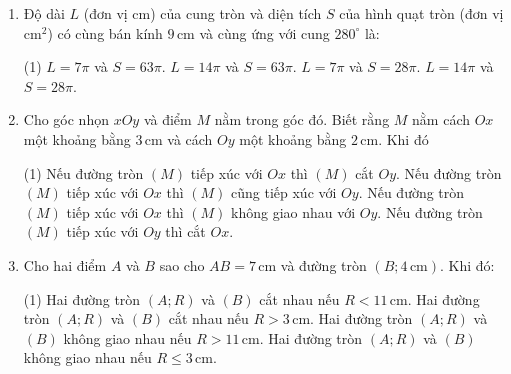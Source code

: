 \begin{practice}
\begin{enumerate}
        \begin{tasks}(1)
            \task[(A)] Điểm đối xứng với $A$ qua $CG$ là $B$.
            \task[(B)] Điểm đối xứng với $A$ qua $CG$ là $D$.
            \task[(C)] Điểm đối xứng với $A$ qua $CG$ là $E$.
            \task[(D)] Điểm đối xứng với $A$ qua $CG$ là $G$.
        \end{tasks}
        \par\noindent\answerbox\par

        \item Độ dài $L$ (đơn vị cm) của cung tròn và diện tích $S$ của hình quạt tròn (đơn vị $\mathrm{cm}^2$) có cùng bán kính $9\,\mathrm{cm}$ và cùng ứng với cung $280^\circ$ là:
        \begin{tasks}(1)
            \task[(A)] $L=7\pi$ và $S=63\pi$.
            \task[(B)] $L=14\pi$ và $S=63\pi$.
            \task[(C)] $L=7\pi$ và $S=28\pi$.
            \task[(D)] $L=14\pi$ và $S=28\pi$.
        \end{tasks}
        \par\noindent\answerbox\par

        \item Cho góc nhọn $xOy$ và điểm $M$ nằm trong góc đó. Biết rằng $M$ nằm cách $Ox$ một khoảng bằng $3\,\mathrm{cm}$ và cách $Oy$ một khoảng bằng $2\,\mathrm{cm}$. Khi đó
        \begin{tasks}(1)
            \task[(A)] Nếu đường tròn $(M)$ tiếp xúc với $Ox$ thì $(M)$ cắt $Oy$.
            \task[(B)] Nếu đường tròn $(M)$ tiếp xúc với $Ox$ thì $(M)$ cũng tiếp xúc với $Oy$.
            \task[(C)] Nếu đường tròn $(M)$ tiếp xúc với $Ox$ thì $(M)$ không giao nhau với $Oy$.
            \task[(D)] Nếu đường tròn $(M)$ tiếp xúc với $Oy$ thì cắt $Ox$.
        \end{tasks}
        \par\noindent\answerbox\par

        \item Cho hai điểm $A$ và $B$ sao cho $AB=7\,\mathrm{cm}$ và đường tròn $(B;4\,\mathrm{cm})$. Khi đó:
        \begin{tasks}(1)
            \task[(A)] Hai đường tròn $(A;R)$ và $(B)$ cắt nhau nếu $R<11\,\mathrm{cm}$.
            \task[(B)] Hai đường tròn $(A;R)$ và $(B)$ cắt nhau nếu $R>3\,\mathrm{cm}$.
            \task[(C)] Hai đường tròn $(A;R)$ và $(B)$ không giao nhau nếu $R>11\,\mathrm{cm}$.
            \task[(D)] Hai đường tròn $(A;R)$ và $(B)$ không giao nhau nếu $R\le3\,\mathrm{cm}$.
        \end{tasks}
        \par\noindent\answerbox\par
    \end{enumerate}


\end{practice}
